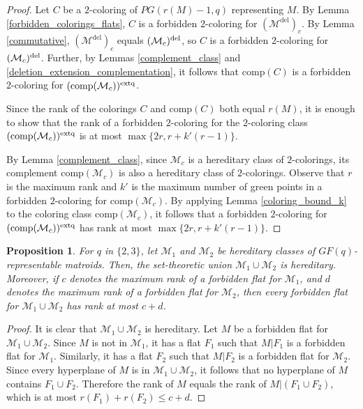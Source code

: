 \documentclass[11pt]{amsart}
\newtheorem{proposition}[theorem]{Proposition}
\theoremstyle{definition}
\theoremstyle{remark}
\numberwithin{equation}{section}
\newcommand\Md{\mathcal{M}^\mathrm{del}}
\begin{document}
\begin{proof}
Let $C$ be a $2$-coloring of $PG(r(M)-1,q)$ representing $M$. By Lemma \ref{forbidden_colorings_flats}, $C$ is a forbidden $2$-coloring for $(\Md)_c$. By Lemma \ref{commutative}, $(\Md)_c$ equals $(\mathcal{M}_c)^{\rm del}$, so $C$ is a forbidden $2$-coloring for $(\mathcal{M}_c)^{\rm del}$. Further, by Lemmas \ref{complement_class} and \ref{deletion_extension_complementation}, it follows that $\mathrm{comp}(C)$ is a forbidden $2$-coloring for $(\mathrm{comp}(\mathcal{M}_c))^{\rm extq}$. 

Since the rank of the colorings $C$ and $\mathrm{comp}(C)$ both equal $r(M)$, it is enough to show that the rank of a forbidden $2$-coloring for the $2$-coloring class $(\mathrm{comp}(\mathcal{M}_c))^{\rm extq}$ is at most $\max\{ 2r, r + k'(r-1) \}$. 

By Lemma \ref{complement_class}, since $\mathcal{M}_c$ is a hereditary class of $2$-colorings, its complement $\mathrm{comp}(\mathcal{M}_c)$ is also a hereditary class of $2$-colorings. Observe that $r$ is the maximum rank and $k'$ is the maximum number of green points in a forbidden $2$-coloring for $\mathrm{comp}(\mathcal{M}_c)$. By applying Lemma \ref{coloring_bound_k} to the coloring class $\mathrm{comp}(\mathcal{M}_c)$, it follows that a forbidden $2$-coloring for $(\mathrm{comp}(\mathcal{M}_c))^{\rm extq}$ has rank at most $\max\{ 2r, r + k'(r-1) \}$. 
\end{proof}






\begin{proposition}
\label{union_of_hereditary_matroids}
For $q$ in $\{2,3\}$, let $\mathcal{M}_1$ and $\mathcal{M}_2$ be hereditary classes of $GF(q)$-representable matroids. Then, the set-theoretic union $\mathcal{M}_1 \cup \mathcal{M}_2$ is hereditary. Moreover, if $c$ denotes the maximum rank of a forbidden flat for $\mathcal{M}_1$, and $d$ denotes the maximum rank of a forbidden flat for $\mathcal{M}_2$, then every forbidden flat for $\mathcal{M}_1 \cup \mathcal{M}_2$ has rank at most $c+d$. 
\end{proposition}


\begin{proof}
It is clear that $\mathcal{M}_1 \cup \mathcal{M}_2$ is hereditary. Let $M$ be a forbidden flat for $\mathcal{M}_1 \cup \mathcal{M}_2$. Since $M$ is not in $\mathcal{M}_1$, it has a flat $F_1$ such that $M|F_1$ is a forbidden flat for $\mathcal{M}_1$. Similarly, it has a flat $F_2$ such that $M|F_2$ is a forbidden flat for $\mathcal{M}_2$. Since every hyperplane of $M$ is in $\mathcal{M}_1 \cup \mathcal{M}_2$, it follows that no hyperplane of $M$ contains $F_1 \cup F_2$. Therefore the rank of $M$ equals the rank of $M|(F_1 \cup F_2)$, which is at most $r(F_1) + r(F_2) \leq c+d$. 
\end{proof}
\end{document}
